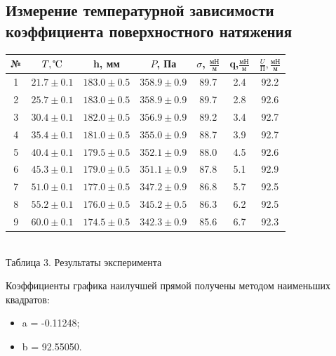 \documentclass[a4paper, 12pt]{article}
\begin{document}
	\subsection[Установка]{Измерение температурной зависимости коэффициента поверхностного натяжения}
	\begin{center}
		\begin{tabular} {|c | c | c | c| c|c|c|}
			\hline	
			№ & $T, \tccelsius $ & h, мм  & $P$, Па  & $\sigma$, $\frac{\text{мН}}{\text{м}}$ & q,$\frac{\text{мН}}{\text{м}}$ & $\frac{U}{\text{П}}, \frac{\text{мН}}{\text{м}}$\\
			\hline
			1 & $ 21.7 \pm 0.1$ & $183.0 \pm 0.5$ & $358.9\pm 0.9$ & 89.7 &2.4
			 &92.2
			 
			 	
			 \\
			\hline
			2 & $ 25.7 \pm 0.1$ & $183.0\pm 0.5$ & $358.9\pm 0.9$ & 89.7 &2.8
			 &92.6
			 
			\\
			\hline
			3 & $ 30.4\pm 0.1$ & $182.0\pm 0.5$ &$ 356.9\pm 0.9$ & 89.2 & 3.4
			& 92.7
			
			 \\
			\hline
			4 & $ 35.4 \pm 0.1$ & $181.0\pm 0.5$ & $355.0\pm 0.9$ & 88.7 &3.9
			 &92.7
			 
			\\
			\hline
			5 &$  40.4 \pm 0.1$ & $179.5\pm 0.5$ & $352.1\pm 0.9$ & 88.0 &4.5
			 & 92.6
			 
			\\
			\hline
			6 & $ 45.3 \pm 0.1$ & $179.0\pm 0.5$ & $351.1\pm 0.9$ & 87.8 &5.1
			 & 92.9
			 
			\\
			\hline
			7 & $ 51.0 \pm 0.1$ & $177.0\pm 0.5$ & $347.2\pm 0.9$ & 86.8 &5.7
			 & 92.5
			 
			\\
			\hline
			8 & $ 55.2 \pm 0.1$ & $176.0\pm 0.5$ & $345.2\pm 0.5$ &  86.3 &6.2
			 & 92.5
			 
			\\
			\hline
			9 & $ 60.0 \pm 0.1$ & $174.5\pm 0.5$ & $342.3\pm 0.9$ & 85.6 &6.7
			 &92.3
			 
			 \\
			\hline
		\end{tabular}\\
		Таблица 3. Результаты эксперимента
	\end{center}

	Коэффициенты графика наилучшей прямой получены методом наименьших квадратов:
	\begin{itemize}
		\item a = -0.11248;
		\item b = 92.55050.
	\end{itemize}
\end{document}
